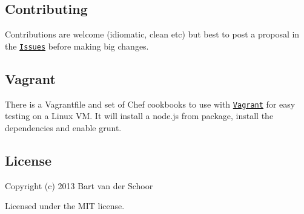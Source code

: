 \subsection*{Contributing}

Contributions are welcome (idiomatic, clean etc) but best to post a proposal in the \href{https://github.com/Bartvds/gruntfile-gtx/issues}{\tt Issues} before making big changes.

\subsection*{Vagrant}

There is a Vagrantfile and set of Chef cookbooks to use with \href{http://www.vagrantup.com}{\tt Vagrant} for easy testing on a Linux VM. It will install a node.\+js from package, install the dependencies and enable grunt.

\subsection*{License}

Copyright (c) 2013 Bart van der Schoor

Licensed under the M\+IT license.

\href{https://bitdeli.com/free}{\tt } 